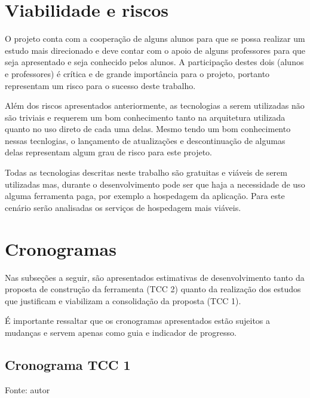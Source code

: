 \chapter{Viabilidade e riscos}
O projeto conta com a cooperação de alguns alunos para que se possa realizar um estudo mais direcionado e deve contar com o apoio de alguns professores
para que seja apresentado e seja conhecido pelos alunos. A participação destes dois (alunos e professores) é crítica  e de grande importância para o projeto,
portanto representam um risco para o sucesso deste trabalho.

Além dos riscos apresentados anteriormente, as tecnologias a serem utilizadas não são triviais e requerem um bom conhecimento tanto na arquitetura utilizada
quanto no uso direto de cada uma delas. Mesmo tendo um bom conhecimento nessas tecnlogias, o lançamento de atualizações e descontinuação de algumas delas representam
algum grau de risco para este projeto.

Todas as tecnologias descritas neste trabalho são gratuitas e viáveis de serem utilizadas mas, durante o desenvolvimento pode ser que haja a 
necessidade de uso alguma ferramenta paga, por exemplo a hospedagem da aplicação. Para este cenário serão analisadas os serviços de hospedagem mais
viáveis.

 
\chapter{Cronogramas}
Nas subseções a seguir, são apresentados estimativas de desenvolvimento tanto da proposta de construção da ferramenta (TCC 2) quanto da 
realização dos estudos que justificam e viabilizam a consolidação da proposta (TCC 1). 

É importante ressaltar que os cronogramas apresentados estão sujeitos a mudanças e servem apenas como guia e indicador de progresso.

\section{Cronograma TCC 1}


\begin{table}[h]
	\centering
	\caption{Cronograma TCC 1.}
	\label{perfil}
	Fonte: autor
\end{table}


